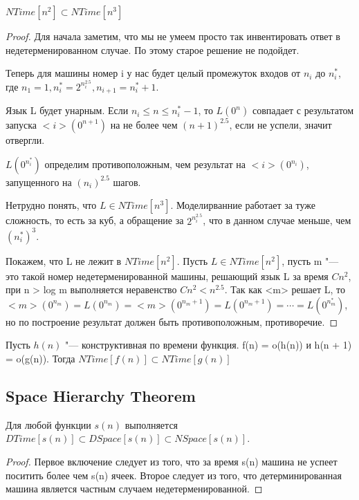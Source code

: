 \begin{theorem}
	$NTime[n^2] \subset NTime[n^3]$
\end{theorem} 
\begin{proof}
	Для начала заметим, что мы не умеем просто так инвентировать ответ
	в недетерменированном случае. По этому старое решение не подойдет.

        Теперь для машины номер i у нас будет целый промежуток входов 
        от $n_i$ до $n_i^*$, где $n_1 = 1, n_i^* = 2^{n_i^{2.5}}, n_{i + 1} = n_i^* + 1$.

        Язык L будет унарным. Если $n_i \le n \le n_i^* - 1$, то $L(0^n)$
        совпадает с результатом запуска $<i>(0^{n + 1})$ на не более чем $(n + 1)^{2.5}$, 
        если не успели, значит отвергли. 

        $L(0^{n_i^*})$ определим противоположным, чем результат на $<i>(0^{n_i})$, 
        запущенного на $(n_i)^{2.5}$ шагов. 

        Нетрудно понять, что $L \in NTime[n^3]$. Моделирванние работает за 
        туже сложность, то есть за куб, а обращение за $2^{n_i^{2.5}}$, что 
        в данном случае меньше, чем $(n_i^*)^3$.

        Покажем, что L не лежит в $NTime[n^2]$. Пусть $L \in NTime[n^2]$, 
        пусть m "--- это такой номер недетерменированной машины, решающий 
        язык L за время $Cn^2$, при n > log m выполняется 
        неравенство $Cn^2 < n^{2.5}$. Так как <m>  решает L, то 
        $<m>(0^{n_m}) = L(0^{n_m}) = <m>(0^{n_m + 1}) = L(0^{n_m + 1}) = \cdots = L(0^{n_m^*})$, 
        но по построение результат должен быть противоположным, противоречие. 
\end{proof}

\begin{theorem}
	Пусть $h(n)$ "--- конструктивная по времени функция. f(n) = o(h(n))
	и h(n + 1) = o(g(n)). Тогда $NTime[f(n)] \subset NTime[g(n)]$
\end{theorem}

\subsection{Space Hierarchy Theorem}
\begin{theorem}
	Для любой функции $s(n)$ выполняется $DTime[s(n)] \subset DSpace[s(n)] \subset NSpace[s(n)]$.
\end{theorem}
\begin{proof}
	Первое включение следует из того, что за время s(n) машина не 
	успеет поситить более чем s(n) ячеек. Второе следует 
	из того, что детерминированная машина является частным случаем 
	недетерменированной. 
\end{proof}

